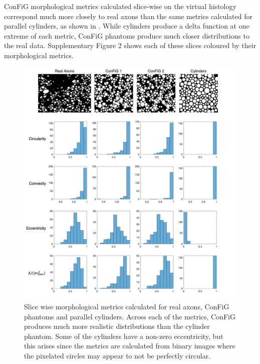 ConFiG morphological metrics calculated slice-wise on the virtual histology correspond much more closely to real axons than the same metrics calculated for parallel cylinders, as shown in . While cylinders produce a delta function at one extreme of each metric, ConFiG phantoms produce much closer distributions to the real data. Supplementary Figure 2 shows each of these slices coloured by their morphological metrics.

\begin{figure}
  \centering
  \includegraphics[width=\textwidth]{figures/config/slice_wise_metrics_whitebg.png}
  \caption[Slice-wise microstructural measurements]{Slice wise morphological metrics calculated for real axons, ConFiG phantoms and parallel cylinders. Across each of the metrics, ConFiG produces much more realistic distributions than  the cylinder phantom. Some of the cylinders have a non-zero eccentricity, but this arises since the metrics are calculated from binary images where the pixelated circles may appear to not be perfectly circular.}
  \label{fig:config_res_slice_wise_metrics}
\end{figure}

